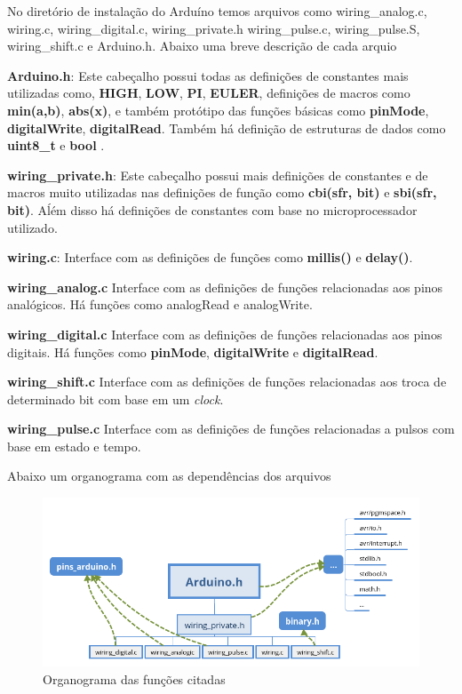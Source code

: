 No diretório de instalação do Arduíno temos arquivos como wiring\_analog.c, wiring.c, wiring\_digital.c, wiring\_private.h  wiring\_pulse.c, wiring\_pulse.S, wiring\_shift.c e Arduino.h. Abaixo uma breve descrição de cada arquio

\begin{alineas}
    \item \textbf{Arduino.h}: Este cabeçalho possui todas as definições de constantes mais utilizadas como, \textbf{HIGH}, \textbf{LOW}, \textbf{PI}, \textbf{EULER}, definições de macros como  \textbf{min(a,b)}, \textbf{abs(x)}, e também protótipo das funções básicas como \textbf{pinMode}, \textbf{digitalWrite}, \textbf{digitalRead}. Também há definição de estruturas de dados como \textbf{uint8\_t} e \textbf{bool} .
    \item \textbf{wiring\_private.h}: Este cabeçalho possui mais definições de constantes e de macros muito utilizadas nas definições de função como \textbf{cbi(sfr, bit)} e \textbf{sbi(sfr, bit)}. Aĺém disso há definições de constantes com base no microprocessador utilizado.
    \item \textbf{wiring.c}: Interface com as definições de funções como \textbf{millis()} e \textbf{delay()}. 
    \item \textbf{wiring\_analog.c} Interface com as definições de funções relacionadas aos pinos analógicos. Há funções como analogRead e analogWrite. 
    \item \textbf{wiring\_digital.c} Interface com as definições de funções relacionadas aos pinos digitais. Há funções como \textbf{pinMode}, \textbf{digitalWrite} e \textbf{digitalRead}.
    \item \textbf{wiring\_shift.c} Interface com as definições de funções relacionadas aos troca de determinado bit com base em um \emph{clock}. 
    \item \textbf{wiring\_pulse.c} Interface com as definições de funções relacionadas a pulsos com base em estado e tempo. 
    
    Abaixo um organograma com as dependências dos arquivos
    
    \begin{figure}[htb]
    	\caption{\label{Organograma}Organograma das funções citadas}
    	\begin{center}
    	    \includegraphics[scale=0.5]{artigo/refs/org_head_arduino}
    	\end{center}
    \end{figure}
    
\end{alineas}

